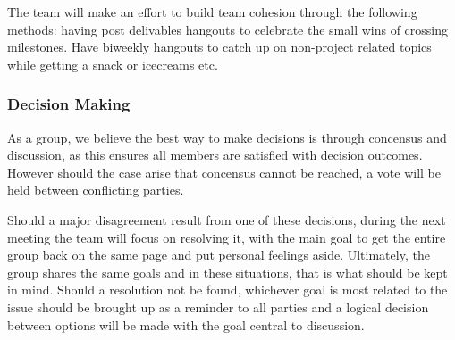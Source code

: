 \documentclass{article}
\begin{document}
The team will make an effort to build team cohesion through the following methods: having post delivables hangouts to celebrate the small wins of crossing milestones. Have biweekly hangouts to catch up on non-project related topics while getting a snack or icecreams etc.

\subsubsection*{Decision Making} 

\iffalse
\wss{How will you make decisions in your group? Consensus?  Vote? How will you
handle disagreements? }
\fi

As a group, we believe the best way to make decisions is through concensus and discussion, 
as this ensures all members are satisfied with decision outcomes. However should the case 
arise that concensus cannot be reached, a vote will be held between conflicting parties.

Should a major disagreement result from one of these decisions, during the next meeting 
the team will focus on resolving it, with the main goal to get the entire group back on 
the same page and put personal feelings aside. Ultimately, the group shares the same goals 
and in these situations, that is what should be kept in mind. Should a resolution not be found, 
whichever goal is most related to the issue should be brought up as a reminder to all 
parties and a logical decision between options will be made with the goal central to discussion.
\end{document}
